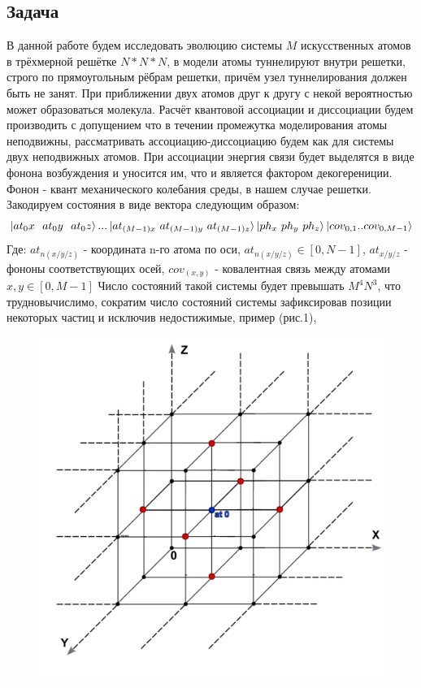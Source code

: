 \documentclass[12pt, a4paper]{article}
\begin{document}
\subsection{Задача}
\qquad В данной работе будем исследовать эволюцию системы $M$ искусственных атомов в трёхмерной решётке $N*N*N$, в модели атомы туннелируют внутри решетки, строго по прямоугольным рёбрам решетки, причём узел туннелирования должен быть не занят. При приближении двух атомов друг к другу с некой вероятностью может образоваться молекула. Расчёт квантовой ассоциации и диссоциации будем производить с допущением что в течении промежутка моделирования атомы неподвижны, рассматривать ассоциацию-диссоциацию будем как для системы двух неподвижных атомов. При ассоциации энергия связи будет выделятся в виде фонона возбуждения и уносится им, что и является фактором декогерениции. Фонон - квант механического колебания среды, в нашем случае решетки.
\newline
Закодируем состояния в виде вектора следующим образом:
\[\ket{at_0x\ \ at_0y\ \ at_0z}...\ket{at_{(M-1)x}\ at_{(M-1)y}\ at_{(M-1)z}} \ket{ph_x \ ph_y \ ph_z}\ket{cov_{0,1}..cov_{0,M-1}}\]
Где:\newline
$at_{n(x/y/z)}$ - координата n-го атома по оси, $at_{n(x/y/z)}\in[0,N-1]$,\newline
$at_{x/y/z}$ - фононы соответствующих осей, \newline 
$cov_{(x,y)}$ - ковалентная связь между атомами $x,y\in[0,M-1]$ 
\newline \null\qquad Число состояний такой системы будет превышать $M^4N^3$, что трудновычислимо, сократим число состояний системы зафиксировав позиции некоторых частиц и исключив недостижимые, пример (рис.1), 
\begin{figure}[htp]
\centering
\includegraphics[scale=10.00]{area.png}
\caption{}
\label{}
\end{figure} 
\end{document}

